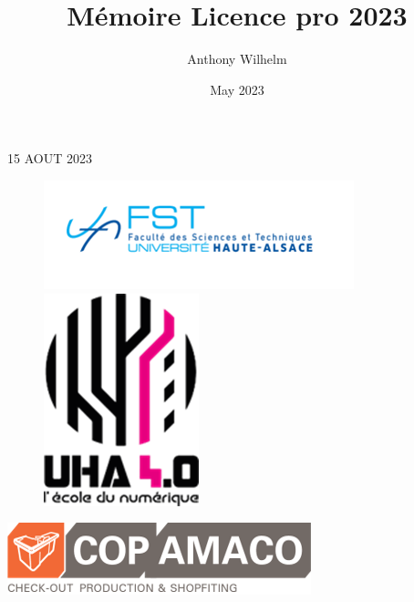 \documentclass[12pt]{article}
\title{Mémoire Licence pro 2023}
\author{Anthony Wilhelm }
\date{May 2023}
\begin{document}

\begin{titlepage}
\centering
\begin{flushright}
15 AOUT 2023\\[10pt]
\end{flushright}
\vfill
\begin{center}

\begin{figure}[h]
    \begin{minipage}[c]{.46\linewidth}
        \centering
        \includegraphics{img/fstlogo.png}
       
    \end{minipage}
    \hfill%
    \begin{minipage}[c]{.46\linewidth}
        \centering
        \includegraphics{img/uha4.0logo.png}
        
    \end{minipage}
\end{figure}
\end{center}
\begin{center}
\includegraphics{img/logoCop.png}
\end{center}
\vfill

\begin{center}
    

\end{center}
\end{titlepage}
\end{document}
